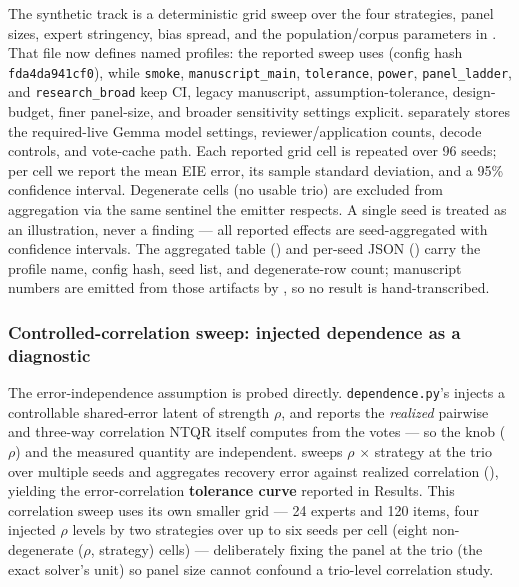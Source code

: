\documentclass[
]{article}
\begin{document}
The synthetic track is a deterministic grid sweep over the four
strategies, panel sizes, expert stringency, bias spread, and the
population/corpus parameters in . That
file now defines named profiles: the reported sweep uses
 (config hash \texttt{fda4da941cf0}), while
\texttt{smoke}, \texttt{manuscript\_main}, \texttt{tolerance},
\texttt{power}, \texttt{panel\_ladder}, and \texttt{research\_broad}
keep CI, legacy manuscript, assumption-tolerance, design-budget, finer
panel-size, and broader sensitivity settings explicit.
 separately stores the required-live Gemma
model settings, reviewer/application counts, decode controls, and
vote-cache path. Each reported grid cell is repeated over 96 seeds; per
cell we report the mean EIE error, its sample standard deviation, and a
95\% confidence interval. Degenerate cells (no usable trio) are excluded
from aggregation via the same sentinel the emitter respects. A single
seed is treated as an illustration, never a finding --- all reported
effects are seed-aggregated with confidence intervals. The aggregated
table () and per-seed JSON
() carry the profile name,
config hash, seed list, and degenerate-row count; manuscript numbers are
emitted from those artifacts by
, so no result is
hand-transcribed.

\subsubsection{Controlled-correlation sweep: injected dependence as a
diagnostic}\label{controlled-correlation-sweep-injected-dependence-as-a-diagnostic}

The error-independence assumption is probed directly.
\texttt{dependence.py}'s
injects a controllable shared-error latent of strength \(\rho\), and
 reports the \emph{realized}
pairwise and three-way correlation NTQR itself computes from the votes
--- so the knob (\(\rho\)) and the measured quantity are independent.
 sweeps \(\rho\) \texorpdfstring{\ensuremath{\times}}{x} strategy at the trio
over multiple seeds and aggregates recovery error against realized
correlation (), yielding the
error-correlation \textbf{tolerance curve} reported in Results. This
correlation sweep uses its own smaller grid --- 24 experts and 120
items, four injected \(\rho\) levels by two strategies over up to six
seeds per cell (eight non-degenerate (\(\rho\), strategy) cells) ---
deliberately fixing the panel at the trio (the exact solver's unit) so
panel size cannot confound a trio-level correlation study.
\end{document}
